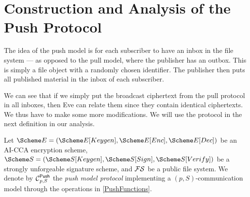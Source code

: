 \section{Construction and Analysis of the Push Protocol}
\label{PushAnalysis}

The idea of the push model is for each subscriber to have an inbox in the file 
system --- as opposed to the pull model, where the publisher has an outbox.
This is simply a file object with a randomly chosen identifier.
The publisher then puts all published material in the inbox of each subscriber.

We can see that if we simply put the broadcast ciphertext from the pull 
protocol in all inboxes, then Eve can relate them since they contain identical 
ciphertexts.
We thus have to make some more modifications.
We will use the protocol in the next definition in our analysis.

\begin{definition}\label{PushModel}
  Let \(\E = (\E[Keygen], \E[Enc], \E[Dec])\) be an AI-CCA encryption scheme,
  \(\S = (\S[Keygen], \S[Sign], \S[Verify])\) be a strongly unforgeable 
  signature scheme,
  and \(\operatorname{\mathcal{FS}}\) be a public file system.
  We denote by \(\Push[p, S]\) the \emph{push model protocol} implementing 
  a \((p, S)\)-communication model through the operations in 
  \cref{PushFunctions}.
\end{definition}

